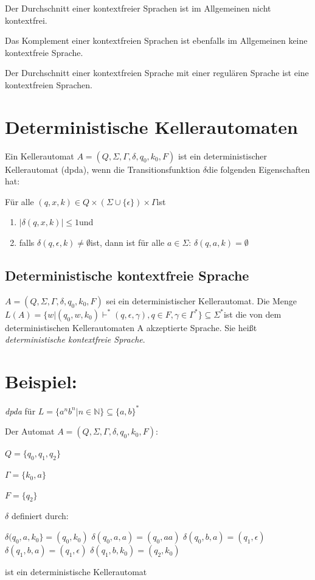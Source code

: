 Der Durchschnitt einer kontextfreier Sprachen ist im Allgemeinen nicht
kontextfrei.

Das Komplement einer kontextfreien Sprachen ist ebenfalls im Allgemeinen
keine kontextfreie Sprache.

Der Durchschnitt einer kontextfreien Sprache mit einer regulären Sprache
ist eine kontextfreien Sprachen.


\section{Deterministische Kellerautomaten}

Ein Kellerautomat $A=(Q,\Sigma,\Gamma,\delta,q_{0},k_{0},F)$ ist
ein deterministischer Kellerautomat (dpda), wenn die Transitionsfunktion
$\delta$die folgenden Eigenschaften hat:

Für alle $(q,x,k)\in Q\times(\Sigma\cup\{\epsilon\})\times\Gamma$ist
\begin{enumerate}
\item $|\delta(q,x,k)|\leq1$und
\item falls $\delta(q,\epsilon,k)\neq\emptyset$ist, dann ist für alle $a\in\Sigma$:
$\delta(q,a,k)=\emptyset$
\end{enumerate}

\subsection{Deterministische kontextfreie Sprache}

$A=(Q,\Sigma,\Gamma,\delta,q_{0},k_{0},F)$ sei ein deterministischer Kellerautomat. Die Menge $L(A)=\{w|(q_{0},w,k_{0})\vdash^{*}(q,\epsilon,\gamma),q\in F,\gamma\in\Gamma^{*}\}\subseteq\Sigma^{*}$ist
die von dem deterministischen Kellerautomaten A akzeptierte Sprache.
Sie heißt \emph{deterministische kontextfreie Sprache}.


\section*{Beispiel:}

\emph{dpda} für $L=\{a^{n}b^{n}|n\in\mathbb{N}\}\subseteq\{a,b\}^{*}$

Der Automat $A=(Q,\Sigma,\Gamma,\delta,q_{\text{0}},k_{0},F)$:

$Q=\{q_{0},q_{1},q_{2}\}$

\emph{$\Gamma=\{k_{0},a\}$}

$F=\{q_{2}\}$

$\delta$ definiert durch:

$\delta(q_{0},a,k_{0}\}=(q_{0},k_{0})$ $\delta(q_{0},a,a)=(q_{0},aa)$
$\delta(q_{0},b,a)=(q_{1},\epsilon)$ \newline
$\delta(q_{1},b,a)=(q_{1},\epsilon)$ $\delta(q_{1},b,k_{0})=(q_{2},k_{0})$

ist ein deterministische Kellerautomat
